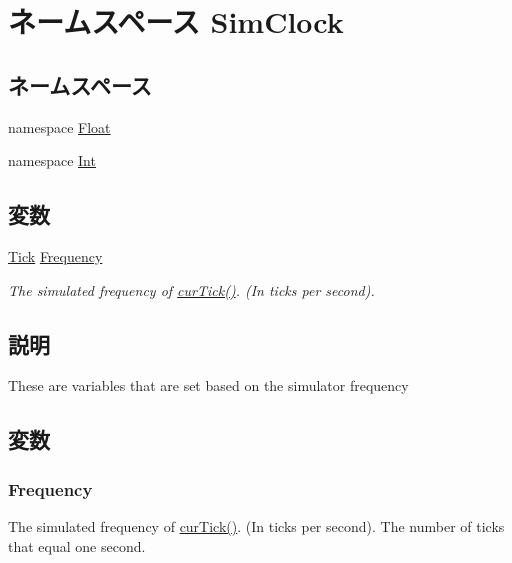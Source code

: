 \hypertarget{namespaceSimClock}{
\section{ネームスペース SimClock}
\label{namespaceSimClock}
}
\subsection*{ネームスペース}
\begin{DoxyCompactItemize}
\item 
namespace \hyperlink{namespaceSimClock_1_1Float}{Float}
\item 
namespace \hyperlink{namespaceSimClock_1_1Int}{Int}
\end{DoxyCompactItemize}
\subsection*{変数}
\begin{DoxyCompactItemize}
\item 
\hyperlink{base_2types_8hh_a5c8ed81b7d238c9083e1037ba6d61643}{Tick} \hyperlink{namespaceSimClock_af196276bdf8e65836e88981a33d57943}{Frequency}
\begin{DoxyCompactList}\small\item\em The simulated frequency of \hyperlink{statistics_8hh_a7acdccbf0d35ce0c159c0cdd36371b22}{curTick()}. (In ticks per second). \item\end{DoxyCompactList}\end{DoxyCompactItemize}


\subsection{説明}
These are variables that are set based on the simulator frequency 

\subsection{変数}
\hypertarget{namespaceSimClock_af196276bdf8e65836e88981a33d57943}{
\subsubsection[{Frequency}]{ {\bf Frequency}}}
\label{namespaceSimClock_af196276bdf8e65836e88981a33d57943}


The simulated frequency of \hyperlink{statistics_8hh_a7acdccbf0d35ce0c159c0cdd36371b22}{curTick()}. (In ticks per second). The number of ticks that equal one second. 